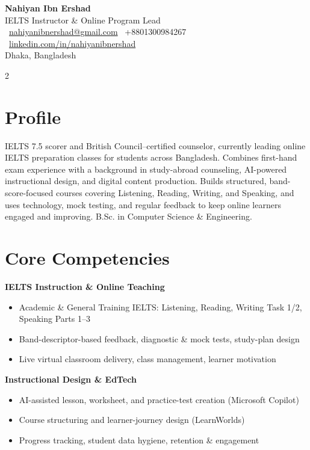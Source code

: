\documentclass[a4paper,10pt]{article}
\begin{document}
\begin{center}
{\Huge \textbf{Nahiyan Ibn Ershad}}\\[2pt]
{\large IELTS Instructor \& Online Program Lead}\\[3pt]
\faEnvelope\ \href{mailto:nahiyanibnershad@gmail.com}{nahiyanibnershad@gmail.com} \quad
\faMobile\ +8801300984267 \quad
\faLinkedin\ \href{https://linkedin.com/in/nahiyanibnershad}{linkedin.com/in/nahiyanibnershad} \\
Dhaka, Bangladesh
\end{center}

\vspace{4pt}
\begin{multicols}{2}

\section*{Profile}
IELTS 7.5 scorer and British Council--certified counselor, currently leading online IELTS preparation classes for students across Bangladesh. Combines first-hand exam experience with a background in study-abroad counseling, AI-powered instructional design, and digital content production. Builds structured, band-score-focused courses covering Listening, Reading, Writing, and Speaking, and uses technology, mock testing, and regular feedback to keep online learners engaged and improving. B.Sc. in Computer Science \& Engineering.
\\

\section*{Core Competencies}
\textbf{IELTS Instruction \& Online Teaching}
\begin{itemize}[leftmargin=1em]
  \item Academic \& General Training IELTS: Listening, Reading, Writing Task 1/2, Speaking Parts 1--3
  \item Band-descriptor-based feedback, diagnostic \& mock tests, study-plan design
  \item Live virtual classroom delivery, class management, learner motivation
\end{itemize}

\textbf{Instructional Design \& EdTech}
\begin{itemize}[leftmargin=1em]
  \item AI-assisted lesson, worksheet, and practice-test creation (Microsoft Copilot)
  \item Course structuring and learner-journey design (LearnWorlds)
  \item Progress tracking, student data hygiene, retention \& engagement
\end{itemize}


\end{multicols}
\end{document}
